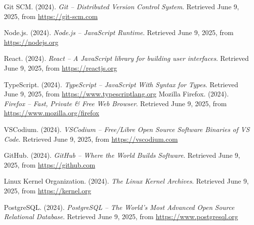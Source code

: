 \begin{thebibliography}{99}
    Git SCM. (2024). \textit{Git – Distributed Version Control System}. Retrieved June 9, 2025, from \url{https://git-scm.com}

    Node.js. (2024). \textit{Node.js – JavaScript Runtime}. Retrieved June 9, 2025, from \url{https://nodejs.org}

    React. (2024). \textit{React – A JavaScript library for building user interfaces}. Retrieved June 9, 2025, from \url{https://reactjs.org}

    TypeScript. (2024). \textit{TypeScript – JavaScript With Syntax for Types}. Retrieved June 9, 2025, from \url{https://www.typescriptlang.org}
    Mozilla Firefox. (2024). \textit{Firefox – Fast, Private \& Free Web Browser}. Retrieved June 9, 2025, from \url{https://www.mozilla.org/firefox}
    
    VSCodium. (2024). \textit{VSCodium – Free/Libre Open Source Software Binaries of VS Code}. Retrieved June 9, 2025, from \url{https://vscodium.com}

    GitHub. (2024). \textit{GitHub – Where the World Builds Software}. Retrieved June 9, 2025, from \url{https://github.com}

    Linux Kernel Organization. (2024). \textit{The Linux Kernel Archives}. Retrieved June 9, 2025, from \url{https://kernel.org}

    PostgreSQL. (2024). \textit{PostgreSQL – The World's Most Advanced Open Source Relational Database}. Retrieved June 9, 2025, from \url{https://www.postgresql.org}
    
\end{thebibliography}
